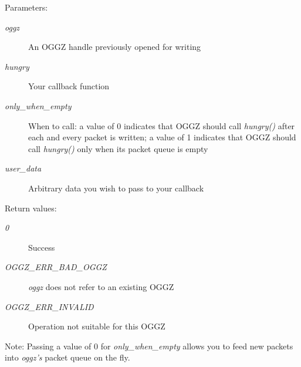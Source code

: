 \begin{Desc}
\item[Parameters:]
\begin{description}
\item[{\em oggz}]An OGGZ handle previously opened for writing \item[{\em hungry}]Your callback function \item[{\em only\_\-when\_\-empty}]When to call: a value of 0 indicates that OGGZ should call {\em hungry()\/} after each and every packet is written; a value of 1 indicates that OGGZ should call {\em hungry()\/} only when its packet queue is empty \item[{\em user\_\-data}]Arbitrary data you wish to pass to your callback \end{description}
\end{Desc}
\begin{Desc}
\item[Return values:]
\begin{description}
\item[{\em 0}]Success \item[{\em OGGZ\_\-ERR\_\-BAD\_\-OGGZ}]{\em oggz\/} does not refer to an existing OGGZ \item[{\em OGGZ\_\-ERR\_\-INVALID}]Operation not suitable for this OGGZ \end{description}
\end{Desc}
\begin{Desc}
\item[Note:]Passing a value of 0 for {\em only\_\-when\_\-empty\/} allows you to feed new packets into {\em oggz's\/} packet queue on the fly. \end{Desc}
